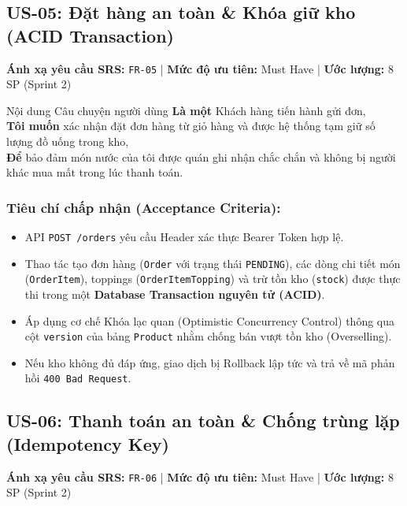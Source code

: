 \documentclass[12pt,a4paper]{article}
\begin{document}
\newpage

\subsection{US-05: Đặt hàng an toàn \& Khóa giữ kho (ACID Transaction)}
\textbf{Ánh xạ yêu cầu SRS:} \texttt{FR-05} \quad | \quad \textbf{Mức độ ưu tiên:} Must Have \quad | \quad \textbf{Ước lượng:} 8 SP (Sprint 2)

\begin{storybox}{Nội dung Câu chuyện người dùng}
\textbf{Là một} Khách hàng tiến hành gửi đơn,\\
\textbf{Tôi muốn} xác nhận đặt đơn hàng từ giỏ hàng và được hệ thống tạm giữ số lượng đồ uống trong kho,\\
\textbf{Để} bảo đảm món nước của tôi được quán ghi nhận chắc chắn và không bị người khác mua mất trong lúc thanh toán.
\end{storybox}

\subsubsection*{Tiêu chí chấp nhận (Acceptance Criteria):}
\begin{itemize}[noitemsep]
    \item[\textbf{AC-05.1}] API \texttt{POST /orders} yêu cầu Header xác thực Bearer Token hợp lệ.
    \item[\textbf{AC-05.2}] Thao tác tạo đơn hàng (\texttt{Order} với trạng thái \texttt{PENDING}), các dòng chi tiết món (\texttt{OrderItem}), toppings (\texttt{OrderItemTopping}) và trừ tồn kho (\texttt{stock}) được thực thi trong một \textbf{Database Transaction nguyên tử (ACID)}.
    \item[\textbf{AC-05.3}] Áp dụng cơ chế Khóa lạc quan (Optimistic Concurrency Control) thông qua cột \texttt{version} của bảng \texttt{Product} nhằm chống bán vượt tồn kho (Overselling).
    \item[\textbf{AC-05.4}] Nếu kho không đủ đáp ứng, giao dịch bị Rollback lập tức và trả về mã phản hồi \texttt{400 Bad Request}.
\end{itemize}

\vspace{0.3cm}
\subsection{US-06: Thanh toán an toàn \& Chống trùng lặp (Idempotency Key)}
\textbf{Ánh xạ yêu cầu SRS:} \texttt{FR-06} \quad | \quad \textbf{Mức độ ưu tiên:} Must Have \quad | \quad \textbf{Ước lượng:} 8 SP (Sprint 2)
\end{document}
